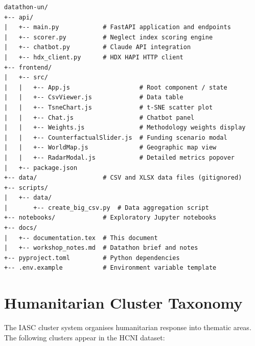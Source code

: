 \documentclass[11pt,a4paper]{article}
\begin{document}
\begin{lstlisting}[language={},numbers=none]
datathon-un/
+-- api/
|   +-- main.py            # FastAPI application and endpoints
|   +-- scorer.py          # Neglect index scoring engine
|   +-- chatbot.py         # Claude API integration
|   +-- hdx_client.py      # HDX HAPI HTTP client
+-- frontend/
|   +-- src/
|   |   +-- App.js                   # Root component / state
|   |   +-- CsvViewer.js             # Data table
|   |   +-- TsneChart.js             # t-SNE scatter plot
|   |   +-- Chat.js                  # Chatbot panel
|   |   +-- Weights.js               # Methodology weights display
|   |   +-- CounterfactualSlider.js  # Funding scenario modal
|   |   +-- WorldMap.js              # Geographic map view
|   |   +-- RadarModal.js            # Detailed metrics popover
|   +-- package.json
+-- data/                  # CSV and XLSX data files (gitignored)
+-- scripts/
|   +-- data/
|       +-- create_big_csv.py  # Data aggregation script
+-- notebooks/             # Exploratory Jupyter notebooks
+-- docs/
|   +-- documentation.tex  # This document
|   +-- workshop_notes.md  # Datathon brief and notes
+-- pyproject.toml         # Python dependencies
+-- .env.example           # Environment variable template
\end{lstlisting}

\appendix
\section{Humanitarian Cluster Taxonomy}

The IASC cluster system organises humanitarian response into thematic areas.
The following clusters appear in the HCNI dataset:
\end{document}
